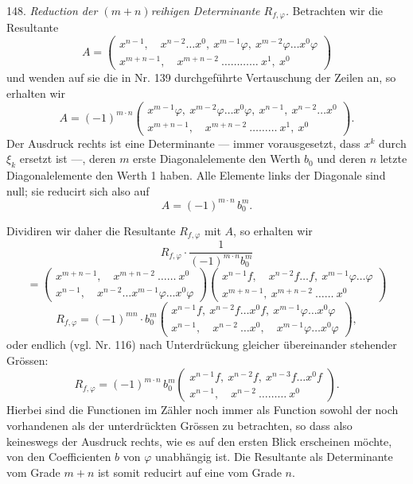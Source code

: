 \documentclass[11pt]{article}
\providecommand{\weberpage}[1]{}
\providecommand{\weq}[2]{\begin{equation}\tag{#1}#2\end{equation}}
\begin{document}
148. \textit{Reduction der $(m+n)$reihigen Determinante $R_{f,\varphi}$.}
Betrachten wir die Resultante
\[
A = \left(\begin{array}{l}
x^{n-1},\quad x^{n-2}\ldots x^0,\ x^{m-1}\varphi,\ x^{m-2}\varphi\ldots x^0\varphi\\[2pt]
x^{m+n-1},\quad x^{m+n-2}\ \ldots\ldots\ldots\ldots\ x^1,\ x^0
\end{array}\right)
\]
und wenden auf sie die in Nr. 139 durchgef\"uhrte Vertauschung der
Zeilen an, so erhalten wir
\[
A = (-1)^{m\cdot n}\left(\begin{array}{l}
x^{m-1}\varphi,\ x^{m-2}\varphi\ldots x^0\varphi,\ x^{n-1},\ x^{n-2}\ldots x^0\\[2pt]
x^{m+n-1},\quad x^{m+n-2}\ \ldots\ldots\ldots\ x^1,\ x^0
\end{array}\right).
\]
Der Ausdruck rechts ist eine Determinante --- immer vorausgesetzt, dass
$x^k$ durch $\xi_k$ ersetzt ist ---, deren $m$ erste Diagonalelemente
den Werth $b_0$ und deren $n$ letzte Diagonalelemente den Werth 1
haben. Alle Elemente links der Diagonale sind null; sie reducirt sich
also auf
\[
A = (-1)^{m\cdot n}\,b_0^m.
\]


\weberpage{154}
Dividiren wir daher die Resultante $R_{f,\varphi}$ mit $A$, so erhalten
wir
\[
R_{f,\varphi}\cdot\frac{1}{(-1)^{m\cdot n}b_0^m}
\]
\[
= \left(\begin{array}{l}
x^{m+n-1},\quad x^{m+n-2}\ \ldots\ldots\ x^0\\[2pt]
x^{n-1},\quad x^{n-2}\ldots x^{m-1}\varphi\ldots x^0\varphi
\end{array}\right)
\left(\begin{array}{l}
x^{n-1}f,\quad x^{n-2}f\ldots f,\ x^{m-1}\varphi\ldots\varphi\\[2pt]
x^{m+n-1},\ x^{m+n-2}\ \ldots\ldots\ x^0
\end{array}\right)
\]
\[
R_{f,\varphi} = (-1)^{mn}\cdot b_0^m\left(\begin{array}{l}
x^{n-1}f,\ x^{n-2}f\ldots x^0f,\ x^{m-1}\varphi\ldots x^0\varphi\\[2pt]
x^{n-1},\quad x^{n-2}\ \ldots x^0,\quad x^{m-1}\varphi\ldots x^0\varphi
\end{array}\right),
\]
oder endlich (vgl. Nr. 116) nach Unterdr\"uckung gleicher
\"ubereinander stehender Gr\"ossen:
\weq{I}{R_{f,\varphi} = (-1)^{m\cdot n}\,b_0^m\left(\begin{array}{l}
x^{n-1}f,\ x^{n-2}f,\ x^{n-3}f\ldots x^0f\\[2pt]
x^{n-1},\quad x^{n-2}\ \ldots\ldots\ldots\ x^0
\end{array}\right).}
Hierbei sind die Functionen im Z\"ahler noch immer als Function sowohl
der noch vorhandenen als der unterdr\"uckten Gr\"ossen zu betrachten,
so dass also keineswegs der Ausdruck rechts, wie es auf den ersten
Blick erscheinen m\"ochte, von den Coefficienten $b$ von $\varphi$
unabh\"angig ist. Die Resultante als Determinante vom Grade $m+n$ ist
somit reducirt auf eine vom Grade $n$.
\end{document}
